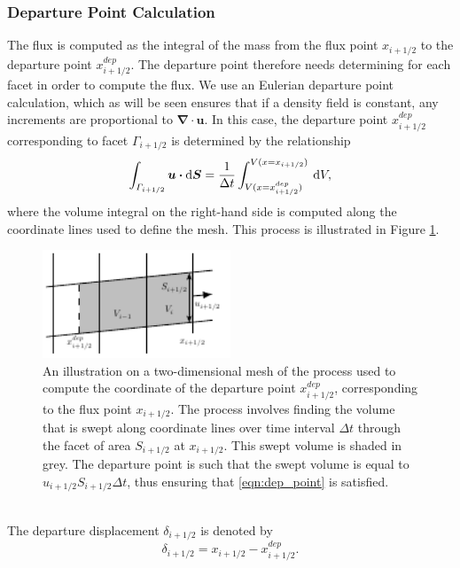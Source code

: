 \documentclass{ametsocV6.1}
\newcommand{\dx}[1]{\hspace{0.75mm}\mathrm{d}{#1}}
\begin{document}
\subsubsection{Departure Point Calculation} \label{sec:dep_pt}
The flux is computed as the integral of the mass from the flux point $x_{i+1/2}$ to the departure point $x^{dep}_{i+1/2}$.
The departure point therefore needs determining for each facet in order to compute the flux.
We use an Eulerian departure point calculation, which as will be seen ensures that if a density field is constant, any increments are proportional to $\bm{\nabla\cdot u}$.
In this case, the departure point $x^{dep}_{i+1/2}$ corresponding to facet $\varGamma_{i+1/2}$ is determined by the relationship
\begin{equation} \label{eqn:dep_point}
\int_{\varGamma_{i+1/2}} \bm{u \cdot} \mathrm{d}\bm{S} = \frac{1}{\Delta t} \int_{V(x=x^{dep}_{i+1/2})}^{V(x=x_{i+1/2})} \dx{V},
\end{equation}
where the volume integral on the right-hand side is computed along the coordinate lines used to define the mesh.
This process is illustrated in Figure \ref{fig:dep_point}. \\
\begin{figure}[h!]
\centering
\includegraphics[width=0.5\textwidth]{fig_1_dep_points.pdf}
\caption{An illustration on a two-dimensional mesh of the process used to compute the coordinate of the departure point $x^{dep}_{i+1/2}$, corresponding to the flux point $x_{i+1/2}$. The process involves finding the volume that is swept along coordinate lines over time interval $\Delta t$ through the facet of area $S_{i+1/2}$ at $x_{i+1/2}$.
This swept volume is shaded in grey.
The departure point is such that the swept volume is equal to $u_{i+1/2}S_{i+1/2}\Delta t$, thus ensuring that \eqref{eqn:dep_point} is satisfied.}
\label{fig:dep_point}
\end{figure} \\
The departure displacement $\delta_{i+1/2}$ is denoted by
\begin{equation}
\delta_{i+1/2} = x_{i+1/2} - x^{dep}_{i+1/2}.
\end{equation}
\end{document}
